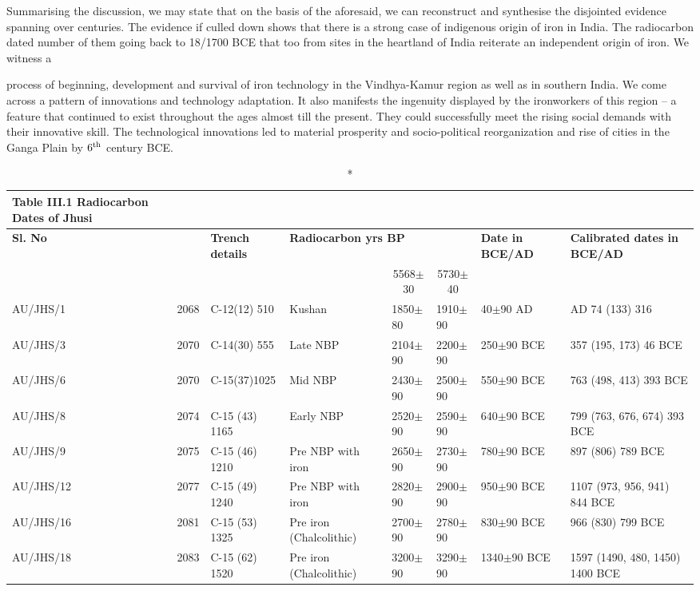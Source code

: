 Summarising the discussion, we may state that on the basis of the aforesaid, we can reconstruct and synthesise the disjointed evidence spanning over centuries. The evidence if culled down shows that there is a strong case of indigenous origin of iron in India. The radiocarbon dated number of them going back to 18/1700 BCE that too from sites in the heartland of India reiterate an independent origin of iron. We witness a 

process of beginning, development and survival of iron technology in the Vindhya-Kamur region as well as in southern India. We come across a pattern of innovations and technology adaptation. It also manifests the ingenuity displayed by the ironworkers of this region – a feature that continued to exist throughout the ages almost till the present. They could successfully meet the rising social demands with their innovative skill. The technological innovations led to material prosperity and socio-political reorganization and rise of cities in the Ganga Plain by $6^{\rm th}$ century BCE. 
\newpage

{\setlength\tabcolsep{2pt}
{\fontsize{7}{9}\selectfont
\begin{longtable}{|p{1.1cm}|c|p{1.4cm}|p{1cm}|p{.8cm}|p{.8cm}|p{1.1cm}|p{1.5cm}|}
\caption*{Table III.1 Radiocarbon Dates of Jhusi}\label{table III.1}\\
\hline
\multicolumn{1}{|m{1.1cm}|}{\centering \textbf{Sl. No}}& & \multicolumn{1}{m{1.4cm}|}{\centering \textbf{Trench details}} & \multicolumn{3}{m{3cm}|}{\centering \textbf{Radiocarbon yrs BP}} & \multicolumn{1}{m{1.1cm}|}{\centering \textbf{Date in BCE/AD}} & \multicolumn{1}{m{1.5cm}|}{\centering \textbf{Calibrated dates in BCE/AD}}\\
& & &  \multicolumn{1}{c}{~~~~} & \multicolumn{1}{c}{5568$\pm$30} & \multicolumn{1}{c|}{5730$\pm$40} & & \\
\endfirsthead
\hline
\endhead
\hline
\endfoot
\hline
AU/JHS/1 & 2068 & C-12(12) 510 & Kushan & \hbox{1850$\pm$80} & \hbox{1910$\pm$90} & \hbox{40$\pm$90} AD & AD 74 (133) 316\\
AU/JHS/3 & 2070& C-14(30) 555 & Late NBP& 2104$\pm$90& 2200$\pm$90& 250$\pm$90 BCE& 357 (195, 173) 46 BCE\\
AU/JHS/6 & 2070 & C-15(37)1025 & Mid NBP& 2430$\pm$90& 2500$\pm$90& 550$\pm$90 BCE& 763 (498, 413) 393 BCE\\
AU/JHS/8 & 2074 & C-15 (43) 1165 & Early NBP & 2520$\pm$90 & 2590$\pm$90 & 640$\pm$90 BCE & 799 (763, 676, 674) 393 BCE\\
AU/JHS/9 & 2075 & C-15 (46) 1210 &Pre NBP with iron & 2650$\pm$90 & 2730$\pm$90 & 780$\pm$90 BCE & 897 (806) 789 BCE\\
AU/JHS/12 & 2077 & C-15 (49) 1240 & Pre NBP with iron  & 2820$\pm$90 & 2900$\pm$90 & 950$\pm$90 BCE & 1107 (973, 956, 941) 844 BCE\\
AU/JHS/16 & 2081 & C-15 (53) 1325 & Pre iron (Chalcolithic) & 2700$\pm$90 & 2780$\pm$90  & 830$\pm$90 BCE & 966 (830) 799 BCE\\
AU/JHS/18 & 2083 & C-15 (62) 1520  & Pre iron (Chalcolithic) & 3200$\pm$90 & 3290$\pm$90 &1340$\pm$90 BCE & 1597 (1490, 480, 1450) 1400 BCE\\
\end{longtable}
}}

